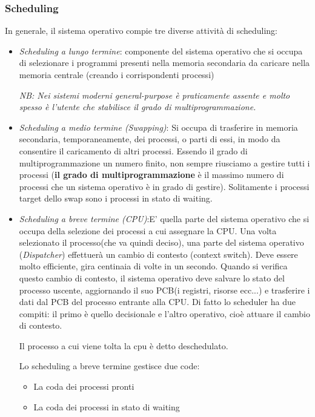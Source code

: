 \documentclass{article}
\begin{document}
\subsubsection{Scheduling}
\noindent In generale, il sistema operativo compie tre diverse attività 
di scheduling:
\begin{itemize}
    \item \textit{Scheduling a lungo termine}: componente
    del sistema operativo che si occupa di selezionare i programmi 
    presenti nella memoria secondaria da caricare nella memoria centrale
    (creando i corrispondenti processi)
    
    \textit{NB: Nei sistemi moderni general-purpose è praticamente assente e 
    molto spesso è l'utente che stabilisce il grado di multiprogrammazione.}

    \item \textit{Scheduling a medio termine (Swapping)}:
    Si occupa di trasferire in memoria secondaria, temporaneamente,
    dei processi, o parti di essi, in modo da consentire il caricamento di
    altri processi. Essendo il grado di multiprogrammazione un numero finito,
    non sempre riusciamo a gestire tutti i processi (\textbf{il grado di multiprogrammazione}
    è il massimo numero di processi che un sistema operativo è in grado di 
    gestire). Solitamente i processi target dello swap sono i processi in stato di waiting.
        
    \item \textit{Scheduling a breve termine (CPU)}:E' quella parte del sistema operativo
    che si occupa della selezione dei processi a cui assegnare la CPU. 
    Una volta selezionato il processo(che va quindi deciso), 
    una parte del sistema operativo (\textit{Dispatcher}) effettuerà un cambio di 
    contesto (context switch).
    Deve essere molto efficiente, gira centinaia di volte in un secondo.
    Quando si verifica questo cambio di contesto, il sistema operativo deve
    salvare lo stato del processo uscente, aggiornando il suo PCB(i registri, risorse ecc...)
    e trasferire i dati dal PCB del processo entrante alla CPU.
    Di fatto lo scheduler ha due compiti: il primo è quello decisionale e 
    l'altro operativo, cioè attuare il cambio di contesto. 
    
    Il processo a cui viene tolta la cpu è detto deschedulato.

    Lo scheduling a breve termine gestisce due code: \begin{itemize}
        \item La coda dei processi pronti
        \item La coda dei processi in stato di waiting 
    \end{itemize}

\end{itemize}
\end{document}
